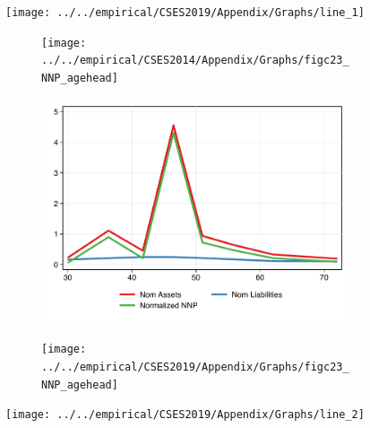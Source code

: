 \documentclass[11pt,letterpaper]{article}
\begin{document}
\begin{figure}
			\texttt{[image: ../../empirical/CSES2019/Appendix/Graphs/line\_1]} \vspace{-3em}
			\newline
			
			\begin{subfigure}{.33\textwidth}
				\centering
				\texttt{[image: ../../empirical/CSES2014/Appendix/Graphs/figc23\_NNP\_agehead]} 
				\vspace{-2.5em}
				\newline {}
			\end{subfigure}
			\begin{subfigure}{.33\textwidth}
				\centering
				\includegraphics[width=1\linewidth]{../../empirical/CSES2017/Appendix/Graphs/figc23_NNP_agehead} 
				\vspace{-2.5em}
				\newline {}
			\end{subfigure}
			\begin{subfigure}{.33\textwidth}
				\centering
				\texttt{[image: ../../empirical/CSES2019/Appendix/Graphs/figc23\_NNP\_agehead]} 
				\vspace{-2.5em}
				\newline {}
			\end{subfigure}
			
			\texttt{[image: ../../empirical/CSES2019/Appendix/Graphs/line\_2]} 
			\vspace{-2.7em}
			\newline
			

\end{figure}
\end{document}
